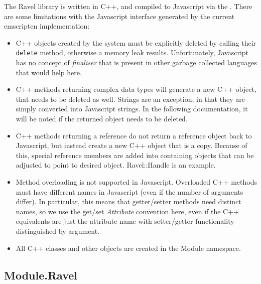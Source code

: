 \documentclass{article}
\begin{document}
The Ravel library is written in C++, and compiled to Javascript via
the . There are some
limitations with the Javascript interface generated by the current
emscripten implementation:
\begin{itemize}
\item C++ objects created by the system must be explicitly deleted by
  calling their \verb+delete+ method, otherwise a memory leak
  results. Unfortunately, Javascript has no concept of {\em finaliser}
  that is present in other garbage collected languages that would help
  here.
\item C++ methods returning complex data types will generate a new C++
  object, that needs to be deleted as well. Strings are an exception, in
  that they are simply converted into Javascript strings. In the following
  documentation, it will be noted if the returned object needs to be
  deleted.
\item C++ methods returning a reference do not return a reference
  object back to Javascript, but instead create a new C++ object that is
  a copy. Because of this, special reference members are added into
  containing objects that can be adjusted to point to desired
  object. Ravel::Handle is an example.
\item Method overloading is not supported in Javascript. Overloaded
  C++ methods must have different names in Javascript (even if the
  number of arguments differ). In particular, this means that
  getter/setter methods need distinct names, so we use the get/set{\em
    Attribute} convention here, even if the C++ equivalents are just the
  attribute name with setter/getter functionality distinguished by argument.
\item All C++ classes and other objects are created in the Module namespace.
\end{itemize}

\subsection{Module.Ravel}
\end{document}
